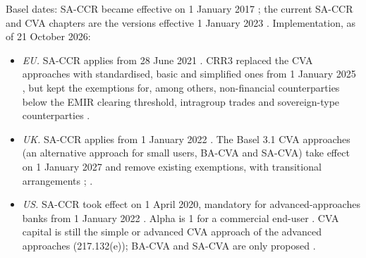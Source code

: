 \begin{qfrule}
 Basel dates: SA-CCR became effective on 1 January 2017 \citep[sec.~D, p.~3]{bcbs-sa-ccr-2014}; the current SA-CCR and CVA chapters are the versions effective 1 January 2023 \citep[CRE52 and MAR50]{basel-framework-ccr-mar-2026}. Implementation, as of 21 October 2026:
\begin{itemize}
\item \emph{EU.} SA-CCR applies from 28 June 2021 \citep[Art.~3(2)]{eu-2019-876-crr2}. CRR3 replaced the CVA approaches with standardised, basic and simplified ones from 1 January 2025 \citep[Art.~1(199) and Art.~2]{eu-2024-1623-crr3}, but kept the exemptions for, among others, non-financial counterparties below the EMIR clearing threshold, intragroup trades and sovereign-type counterparties \citep[Art.~382(4)]{eu-2013-575-crr}.
\item \emph{UK.} SA-CCR applies from 1 January 2022 \citep[p.~8]{pra-ps17-21-basel-2021}. The Basel 3.1 CVA approaches (an alternative approach for small users, BA-CVA and SA-CVA) take effect on 1 January 2027 and remove existing exemptions, with transitional arrangements \citep[paras~1.8 and~1.13]{pra-ps17-23-basel31-2023}; \citep[para.~1.23]{pra-ps1-26-basel31-2026}.
\item \emph{US.} SA-CCR took effect on 1 April 2020, mandatory for advanced-approaches banks from 1 January 2022 \citep[p.~4362]{us-sa-ccr-rule-2020}. Alpha is 1 for a commercial end-user \citep[12 CFR 217.132(c)(5)(iv)]{ecfr-12cfr217-2026}. CVA capital is still the simple or advanced CVA approach of the advanced approaches (217.132(e)); BA-CVA and SA-CVA are only proposed \citep[p.~14955]{us-capital-proposal-2026}.
\end{itemize}


\end{qfrule}
